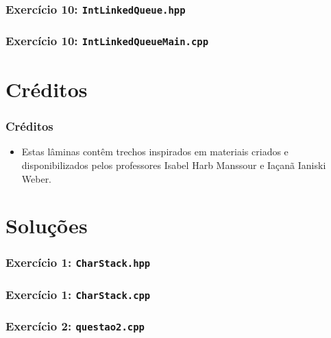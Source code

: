 \documentclass[aspectratio=169]{beamer}
\begin{document}
\begin{frame}[fragile]\frametitle{Exercício 10: \texttt{IntLinkedQueue.hpp}}

\end{frame}

\begin{frame}[fragile]\frametitle{Exercício 10: \texttt{IntLinkedQueueMain.cpp}}
\fontsize{6pt}{6pt}\selectfont{

}
\end{frame}

\section{Créditos}

\begin{frame}\frametitle{Créditos}
\begin{itemize}
	\item Estas lâminas contêm trechos inspirados em materiais criados e disponibilizados pelos professores Isabel Harb Manssour e Iaçanã Ianiski Weber.
\end{itemize}
\end{frame}

\section{Soluções}

\begin{frame}[fragile]\frametitle{Exercício 1: \texttt{CharStack.hpp}}

\end{frame}

\begin{frame}[fragile]\frametitle{Exercício 1: \texttt{CharStack.cpp}}
\fontsize{5pt}{5pt}\selectfont{

}
\end{frame}

\begin{frame}[fragile]\frametitle{Exercício 2: \texttt{questao2.cpp}}

\end{frame}
\end{document}
